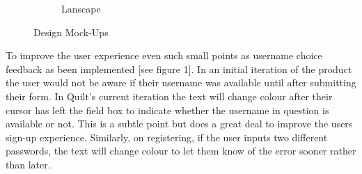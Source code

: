 \documentclass[a4wide, 10pt]{article}
\begin{document}
\begin{figure}
\begin{subfigure}[b]{0.4\textwidth}
                \caption{Lanscape}
        \end{subfigure}
        \caption{Design Mock-Ups}\label{fig:design}
\end{figure}

To improve the user experience even such small points as username choice feedback as been implemented [see figure 1]. In an initial iteration of the product the user would not be aware if their username was available until after submitting their form. In Quilt's current iteration the text will change colour after their cursor has left the field box to indicate whether the username in question is available or not. This is a subtle point but does a great deal to improve the users sign-up experience. Similarly, on registering, if the user inputs two different passwords, the text will change colour to let them know of the error sooner rather than later.
\end{document}

